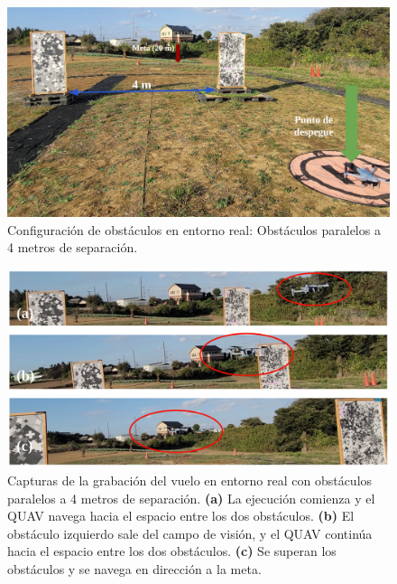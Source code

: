 \begin{figure}[H]
    \centering
    \includegraphics[scale=0.27]{partes/img/real-3-parallelB-0-config.png}
    \caption[Configuración de obstáculos en entorno real: Obstáculos paralelos a 4 metros de separación.]{Configuración de obstáculos en entorno real: Obstáculos paralelos a 4 metros de separación.}
    \label{real-3-parallelB-0-config}
\end{figure}

\begin{figure}[H]
    \centering
    \includegraphics[scale=0.25]{partes/img/real-3-parallelB-1-frames.png}
    \caption[Capturas de la grabación del vuelo en entorno real con obstáculos paralelos a 4 metros de separación.]{Capturas de la grabación del vuelo en entorno real con obstáculos paralelos a 4 metros de separación. \textbf{(a)} La ejecución comienza y el QUAV navega hacia el espacio entre los dos obstáculos. \textbf{(b)} El obstáculo izquierdo sale del campo de visión, y el QUAV continúa hacia el espacio entre los dos obstáculos. \textbf{(c)}  Se superan los obstáculos y se navega en dirección a la meta.}
    \label{real-3-parallelB-1-frames}
\end{figure}

